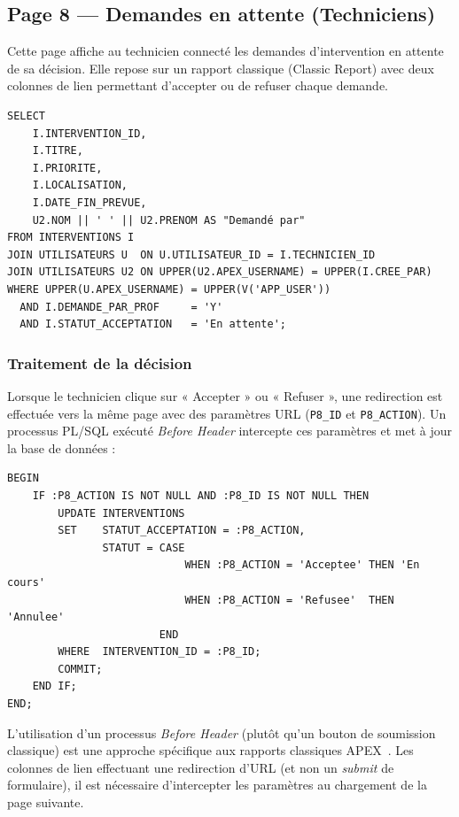 \documentclass[12pt,a4paper,oneside]{report}
\begin{document}
\subsection{Page 8 — Demandes en attente (Techniciens)}

Cette page affiche au technicien connecté les demandes d'intervention en attente de sa décision. Elle repose sur un rapport classique (Classic Report) avec deux colonnes de lien permettant d'accepter ou de refuser chaque demande.

\begin{lstlisting}[language=PLSQL, caption=Requête SQL de la page Demandes en attente]
SELECT
    I.INTERVENTION_ID,
    I.TITRE,
    I.PRIORITE,
    I.LOCALISATION,
    I.DATE_FIN_PREVUE,
    U2.NOM || ' ' || U2.PRENOM AS "Demandé par"
FROM INTERVENTIONS I
JOIN UTILISATEURS U  ON U.UTILISATEUR_ID = I.TECHNICIEN_ID
JOIN UTILISATEURS U2 ON UPPER(U2.APEX_USERNAME) = UPPER(I.CREE_PAR)
WHERE UPPER(U.APEX_USERNAME) = UPPER(V('APP_USER'))
  AND I.DEMANDE_PAR_PROF     = 'Y'
  AND I.STATUT_ACCEPTATION   = 'En attente';
\end{lstlisting}

\subsubsection{Traitement de la décision}

Lorsque le technicien clique sur « Accepter » ou « Refuser », une redirection est effectuée vers la même page avec des paramètres URL (\texttt{P8\_ID} et \texttt{P8\_ACTION}). Un processus PL/SQL exécuté \textit{Before Header} intercepte ces paramètres et met à jour la base de données :

\begin{lstlisting}[language=PLSQL, caption=Processus Before Header de traitement de la décision]
BEGIN
    IF :P8_ACTION IS NOT NULL AND :P8_ID IS NOT NULL THEN
        UPDATE INTERVENTIONS
        SET    STATUT_ACCEPTATION = :P8_ACTION,
               STATUT = CASE
                            WHEN :P8_ACTION = 'Acceptee' THEN 'En cours'
                            WHEN :P8_ACTION = 'Refusee'  THEN 'Annulee'
                        END
        WHERE  INTERVENTION_ID = :P8_ID;
        COMMIT;
    END IF;
END;
\end{lstlisting}

\begin{remarque}
L'utilisation d'un processus \textit{Before Header} (plutôt qu'un bouton de soumission classique) est une approche spécifique aux rapports classiques APEX~\cite{oracle_apex}. Les colonnes de lien effectuant une redirection d'URL (et non un \textit{submit} de formulaire), il est nécessaire d'intercepter les paramètres au chargement de la page suivante.
\end{remarque}
\end{document}
